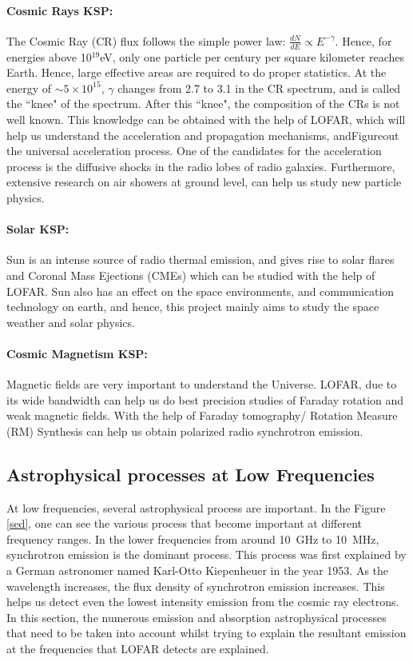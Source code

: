 \documentclass[../main/thesis_msc.tex]{subfiles}
\begin{document}
\paragraph{Cosmic Rays KSP:} The Cosmic Ray (CR) flux follows the simple power law: $\frac{dN}{dE} \propto E^{-\gamma}$. Hence, for energies above 10$^{19}$eV, only one particle per century per square kilometer reaches Earth. Hence, large effective areas are required to do proper statistics. At the energy of $\sim 5 \times 10^{15}$, $\gamma$ changes from 2.7 to 3.1 in the CR spectrum, and is called the ``knee" of the spectrum. After this ``knee", the composition of the CRs is not well known. This knowledge can be obtained with the help of LOFAR, which will help us understand the acceleration and propagation mechanisms, andFigureout the universal acceleration process. One of the candidates for the acceleration process is the diffusive shocks in the radio lobes of radio galaxies. Furthermore, extensive research on air showers at ground level, can help us study new particle physics.
\paragraph{Solar KSP:} Sun is an intense source of radio thermal emission, and gives rise to solar flares and Coronal Mass Ejections (CMEs) which can be studied with the help of LOFAR. Sun also has an effect on the space environments, and communication technology on earth, and hence, this project mainly aims to study the space weather and solar physics.
\paragraph{Cosmic Magnetism KSP:} Magnetic fields are very important to understand the Universe. LOFAR, due to its wide bandwidth can help us do best precision studies of Faraday rotation and weak magnetic fields. With the help of Faraday tomography/ Rotation Measure (RM) Synthesis can help us obtain polarized radio synchrotron emission. 
\subsection{Astrophysical processes at Low Frequencies}
\label{sec:process}
At low frequencies, several astrophysical process are important. In the Figure \ref{sed}, one can see the various process that become important at different frequency ranges. In the lower frequencies from around 10~GHz to 10~MHz, synchrotron emission is the dominant process. This process was first explained by a German astronomer named Karl-Otto Kiepenheuer in the year 1953. As the wavelength increases, the flux density of synchrotron emission increases. This helps us detect even the lowest intensity emission from the cosmic ray electrons. In this section, the numerous emission and absorption astrophysical processes that need to be taken into account whilst trying to explain the resultant emission at the frequencies that LOFAR detects are explained. 
\end{document}
